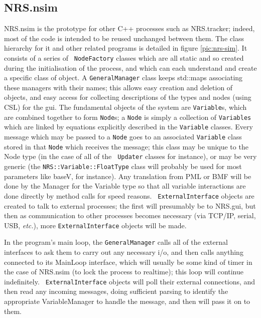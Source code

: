 \documentclass[pdftex,a4paper]{article}
\newif\ifpdf
\newcommand{\etc}{{\it etc.}}
\begin{document}
\subsection{NRS.nsim}
\label{sec:nrssim}

NRS.nsim is the prototype for other C++ processes such as NRS.tracker;
indeed, most of the code is intended to be reused unchanged between
them. The class hierarchy for it and other related programs is
detailed in figure \ref{pic:nrs-sim}. It consists of a series of {\tt
NodeFactory} classes which are all static and so created during the
initialisation of the process, and which can each understand and
create a specific class of object. A {\tt GeneralManager} class keeps
std::maps associating these managers with their names; this allows
easy creation and deletion of objects, and easy access for collecting
descriptions of the types and nodes (using CSL) for the gui. The
fundamental objects of the system are {\tt Variable}s, which are
combined together to form {\tt Node}s; a {\tt Node} is simply a
collection of {\tt Variables} which are linked by equations explicitly
described in the {\tt Variable} classes. Every message which may be
passed to a {\tt Node} goes to an associated {\tt Variable} class
stored in that {\tt Node} which receives the message; this class may
be unique to the Node type (in the case of all of the {\tt
Updater} classes for instance), or may be very generic (the
{\tt NRS::Variable::FloatType} class will probably be used for most
parameters like baseV, for instance). Any translation from PML or BMF
will be done by the Manager for the Variable type so that all variable
interactions are done directly by method calls for speed reasons. {\tt
ExternalInterface} objects are created to talk to external processes;
the first will presumably be to NRS.gui, but then as communication to
other processes becomes necessary (via TCP/IP, serial, USB, \etc),
more {\tt ExternalInterface} objects will be made.

\ifpdf
\begin{figure}[htb]
  \begin{center}
    \texttt{[image: NRS-Sim.pdf]}
    \caption{Class hierarchy in NRS.nsim}
    \label{pic:nrs-sim}
  \end{center}
\end{figure}
\fi

In the program's main loop, the {\tt GeneralManager} calls all of the
external interfaces to ask them to carry out any necessary i/o, and
then calls anything connected to its MainLoop interface, which will
usually be some kind of timer in the case of NRS.nsim (to lock the
process to realtime); this loop will continue indefinitely. {\tt
ExternalInterface} objects will poll their external connections, and
then read any incoming messages, doing sufficient parsing to identify
the appropriate VariableManager to handle the message, and then will
pass it on to them.
\end{document}
